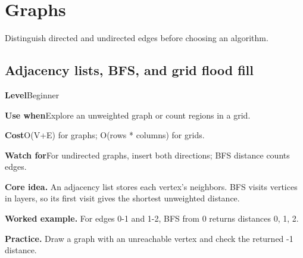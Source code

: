 \documentclass[10pt,letterpaper]{article}
\newcommand{\entrylabel}[1]{\textcolor{accent}{\bfseries #1}}
\begin{document}
\section{Graphs}
\begin{guidebox}Distinguish directed and undirected edges before choosing an algorithm.\end{guidebox}
\subsection{Adjacency lists, BFS, and grid flood fill}
\begin{guidebox}\small
\entrylabel{Level}\quad Beginner\par
\entrylabel{Use when}\quad Explore an unweighted graph or count regions in a grid.\par
\entrylabel{Cost}\quad O(V+E) for graphs; O(rows * columns) for grids.\par
\entrylabel{Watch for}\quad For undirected graphs, insert both directions; BFS distance counts edges.\par
\end{guidebox}
\noindent\textbf{Core idea.} An adjacency list stores each vertex's neighbors. BFS visits vertices in layers, so its first visit gives the shortest unweighted distance.\par
\noindent\textbf{Worked example.} For edges 0-1 and 1-2, BFS from 0 returns distances 0, 1, 2.\par
\noindent\textbf{Practice.} Draw a graph with an unreachable vertex and check the returned -1 distance.\par
\end{document}

